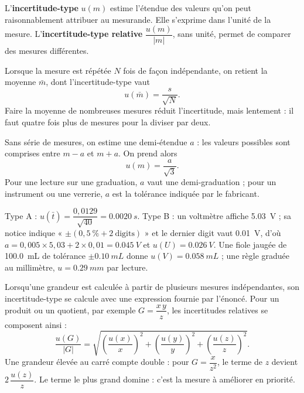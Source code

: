 \begin{definition}
L'\textbf{incertitude-type} $u(m)$ estime l'étendue des valeurs qu'on peut raisonnablement attribuer au mesurande. Elle
s'exprime dans l'unité de la mesure. L'\textbf{incertitude-type relative} $\dfrac{u(m)}{|m|}$, sans unité, permet de comparer des
mesures différentes.
\end{definition}
\begin{loi}
Lorsque la mesure est répétée $N$ fois de façon indépendante, on retient la moyenne $\bar m$, dont l'incertitude-type vaut
\[u(\bar m)=\frac{s}{\sqrt N}.\]
Faire la moyenne de nombreuses mesures réduit l'incertitude, mais lentement : il faut quatre fois plus de mesures pour la
diviser par deux.
\end{loi}
\begin{loi}
Sans série de mesures, on estime une demi-étendue $a$ : les valeurs possibles sont comprises entre $m-a$ et $m+a$. On
prend alors
\[u(m)=\frac{a}{\sqrt3}.\]
Pour une lecture sur une graduation, $a$ vaut une demi-graduation ; pour un instrument ou une verrerie, $a$ est la
tolérance indiquée par le fabricant.
\end{loi}
\begin{exemple}
Type A : $u(\bar t)=\dfrac{0{,}0129}{\sqrt{40}}=\qty{0,0020}{s}$. Type B : un voltmètre affiche \qty{5,03}{V} ; sa notice indique
« $\pm(0{,}5~\%+2~\text{digits})$ » et le dernier digit vaut \qty{0,01}{V}, d'où $a=0{,}005\times5{,}03+2\times0{,}01=\qty{0,045}{V}$ et
$u(U)=\qty{0,026}{V}$. Une fiole jaugée de \qty{100,0}{mL} de tolérance $\pm\qty{0,10}{mL}$ donne $u(V)=\qty{0,058}{mL}$ ; une règle graduée
au millimètre, $u=\qty{0,29}{mm}$ par lecture.
\end{exemple}
\begin{propriete}
Lorsqu'une grandeur est calculée à partir de plusieurs mesures indépendantes, son incertitude-type se calcule avec une
expression fournie par l'énoncé. Pour un produit ou un quotient, par exemple $G=\dfrac{x\,y}{z}$, les incertitudes relatives se
composent ainsi :
\[\frac{u(G)}{|G|}=\sqrt{\left(\frac{u(x)}{x}\right)^2+\left(\frac{u(y)}{y}\right)^2+\left(\frac{u(z)}{z}\right)^2}.\]
Une grandeur élevée au carré compte double : pour $G=\dfrac{x}{z^2}$, le terme de $z$ devient $2\,\dfrac{u(z)}{z}$. Le terme le plus grand
domine : c'est la mesure à améliorer en priorité.
\end{propriete}
